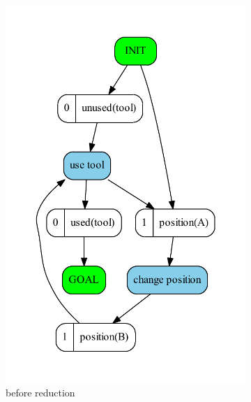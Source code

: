 	
	\begin{figure}
		\begin{subfigure}[b]{0.4\textwidth}
			\includegraphics[scale=0.4]{oneUsage/figures/endsInInit_input}
			\caption{before reduction}
		\end{subfigure}	
		\begin{subfigure}[b]{0.4\textwidth}

\end{subfigure}
\end{figure}

